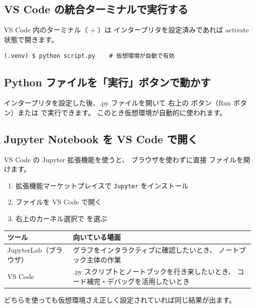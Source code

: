 \subsection{VS Code の統合ターミナルで実行する}

VS Code 内のターミナル（ + \cmd{\`{}}）は
インタープリタを設定済みであれば activate 状態で開きます。

\begin{wslbox}
\begin{lstlisting}[style=bash]
(.venv) $ python script.py    # 仮想環境が自動で有効
\end{lstlisting}
\end{wslbox}

\subsection{Python ファイルを「実行」ボタンで動かす}

インタープリタを設定した後、.py ファイルを開いて
右上の \key{$\triangleright$} ボタン（Run ボタン）または  で実行できます。
このとき仮想環境が自動的に使われます。

\subsection{Jupyter Notebook を VS Code で開く}

VS Code の Jupyter 拡張機能を使うと、
ブラウザを使わずに直接  ファイルを開けます。

\begin{enumerate}
  \item 拡張機能マーケットプレイスで \texttt{Jupyter} をインストール
  \item {} ファイルを VS Code で開く
  \item 右上のカーネル選択で  を選ぶ
\end{enumerate}

\begin{tipbox}
\begin{tabularx}{\linewidth}{lX}
  \toprule
  ツール & 向いている場面 \\
  \midrule
  JupyterLab（ブラウザ） &
    グラフをインタラクティブに確認したいとき、
    ノートブック主体の作業 \\
  VS Code &
    .py スクリプトとノートブックを行き来したいとき、
    コード補完・デバッグを活用したいとき \\
  \bottomrule
\end{tabularx}
どちらを使っても仮想環境さえ正しく設定されていれば同じ結果が出ます。
\end{tipbox}

